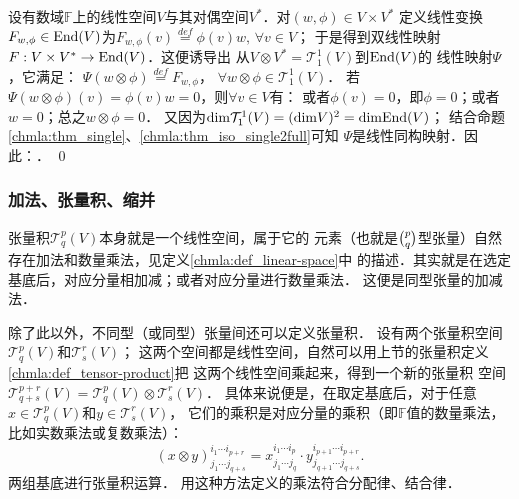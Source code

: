   

\begin{example}\label{chmla:exm_T11TR}
    设有数域$\mathbb{F}$上的线性空间$V$与其对偶空间$V^*$．对$(w,\phi)\in V\times V^*$
    定义线性变换$F_{w,\phi} \in {\rm End} (V)$为$F_{w,\phi}(v)\overset{def}{=}\phi(v) w, \, \forall v \in V$；
    于是得到双线性映射$F: V\times V^* \to {\rm End}(V)$．这便诱导出
    从$V\otimes V^*= \mathcal{T}^1_1(V)$到${\rm End}(V)$的
    线性映射$\Psi$，它满足：
        $\Psi ( w\otimes \phi ) \overset{def}{=} F_{w,\phi}$，
        $\forall w\otimes \phi \in \mathcal{T}^1_1(V) $．
    若$\Psi( w\otimes \phi ) (v)= \phi(v) w =0$，则$\forall v\in V$有：
    或者$\phi(v)=0$，即$\phi=0$；或者$w=0$；总之$w\otimes \phi =0$．
    又因为${\rm dim} \mathcal{T}^1_1(V) = ({\rm dim}V)^2 = {\rm dim} {\rm End} (V)$；
    结合命题\ref{chmla:thm_single}、\ref{chmla:thm_iso_single2full}可知
    $\Psi$是线性同构映射．因此：． \qed
\end{example}



\subsubsection*{加法、张量积、缩并}
张量积$\mathcal{T}^p_q(V)$本身就是一个线性空间，属于它的
元素（也就是$\binom{p}{q}$型张量）自然存在加法和数量乘法，见定义\ref{chmla:def_linear-space}中
的描述．其实就是在选定基底后，对应分量相加减；或者对应分量进行数量乘法．
这便是同型张量的{\heiti 加减法}．


除了此以外，不同型（或同型）张量间还可以定义{\heiti 张量积}．
设有两个张量积空间$\mathcal{T}^p_q(V)$和$\mathcal{T}^r_s(V)$；
这两个空间都是线性空间，自然可以用上节的张量积定义\ref{chmla:def_tensor-product}把
这两个线性空间{\kaishu 乘}起来，得到一个新的张量积
空间$\mathcal{T}^{p+r}_{q+s}(V)=\mathcal{T}^p_q(V)\otimes \mathcal{T}^r_s(V)$．
具体来说便是，在取定基底后，对于任意$x\in \mathcal{T}^p_q(V)$和$y\in \mathcal{T}^r_s(V)$，
它们的乘积是对应分量的乘积（即$\mathbb{F}$值的数量乘法，比如实数乘法或复数乘法）：
\begin{equation}
    (x\otimes y)^{i_1\cdots i_{p+r}}_{j_1\cdots j_{q+s}}=
    x^{i_1\cdots i_{p}}_{j_1\cdots j_{q}} \cdot
    y^{i_{p +1}\cdots i_{p+r}}_{j_{q+1}\cdots j_{q+s}} .
\end{equation}
两组基底进行张量积运算．
用这种方法定义的乘法符合分配律、结合律．

